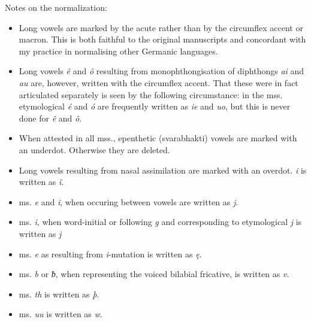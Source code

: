 Notes on the normalization:
  \begin{itemize}
    \item Long vowels are marked by the acute rather than by the circumflex accent or macron. This is both faithful to the original manuscripts and concordant with my practice in normalising other Germanic languages.
    \item Long vowels \emph{ê} and \emph{ô} resulting from monophthongisation of diphthongs \emph{ai} and \emph{au} are, however, written with the circumflex accent. That these were in fact articulated separately is seen by the following circumstance: in the mss. etymological \emph{é} and \emph{ó} are frequently written as \emph{ie} and \emph{uo}, but this is never done for \emph{ê} and \emph{ô}.
    \item When attested in all mss., epenthetic (svarabhakti) vowels are marked with an underdot. Otherwise they are deleted.
    \item Long vowels resulting from nasal assimilation are marked with an overdot. \emph{i} is written as \emph{ï}.
    \item ms. \emph{e} and \emph{i}, when occuring between vowels are written as \emph{j}.
    \item ms. \emph{i}, when word-initial or following \emph{g} and corresponding to etymological \emph{j} is written as \emph{j}
    \item ms. \emph{e} as resulting from \emph{i}-mutation is written as \emph{ę}.
    \item ms. \emph{b} or \emph{ƀ}, when representing the voiced bilabial fricative, is written as \emph{v}.
    \item ms. \emph{th} is written as \emph{þ}.
    \item ms. \emph{uu} is written as \emph{w}.
  \end{itemize}

\sectionline


